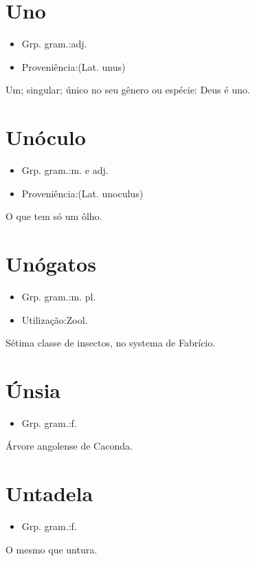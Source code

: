 \documentclass{article}
\begin{document}
\section{Uno}
\begin{itemize}
\item {Grp. gram.:adj.}
\end{itemize}
\begin{itemize}
\item {Proveniência:(Lat. \textunderscore unus\textunderscore )}
\end{itemize}
Um; singular; único no seu gênero ou espécie: \textunderscore Deus é uno\textunderscore .
\section{Unóculo}
\begin{itemize}
\item {Grp. gram.:m.  e  adj.}
\end{itemize}
\begin{itemize}
\item {Proveniência:(Lat. \textunderscore unoculus\textunderscore )}
\end{itemize}
O que tem só um ôlho.
\section{Unógatos}
\begin{itemize}
\item {Grp. gram.:m. pl.}
\end{itemize}
\begin{itemize}
\item {Utilização:Zool.}
\end{itemize}
Sétima classe de insectos, no systema de Fabrício.
\section{Únsia}
\begin{itemize}
\item {Grp. gram.:f.}
\end{itemize}
Árvore angolense de Caconda.
\section{Untadela}
\begin{itemize}
\item {Grp. gram.:f.}
\end{itemize}
O mesmo que \textunderscore untura\textunderscore .
\end{document}
